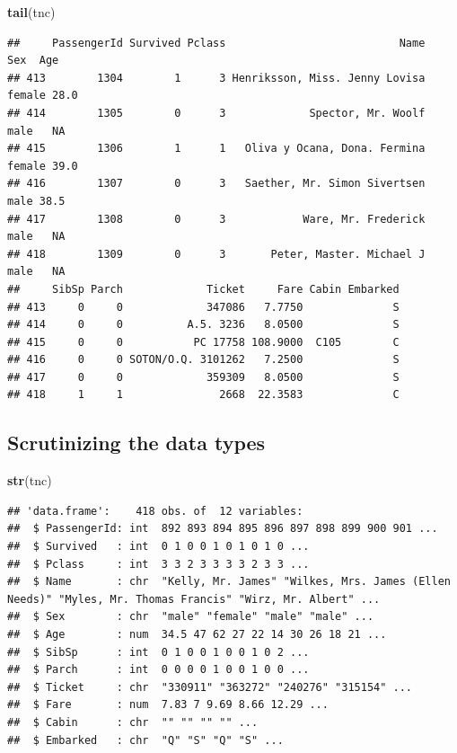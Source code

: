 \documentclass[
]{article}
\newenvironment{Shaded}{\begin{snugshade}}{\end{snugshade}}
\newcommand{\FunctionTok}[1]{\textcolor[rgb]{1.00,0.58,0.35}{\textbf{#1}}}
\newcommand{\NormalTok}[1]{\textcolor[rgb]{0.74,0.68,0.62}{#1}}
\begin{document}
\begin{Shaded}
\begin{Highlighting}[]
\FunctionTok{tail}\NormalTok{(tnc)}
\end{Highlighting}
\end{Shaded}

\begin{verbatim}
##     PassengerId Survived Pclass                           Name    Sex  Age
## 413        1304        1      3 Henriksson, Miss. Jenny Lovisa female 28.0
## 414        1305        0      3             Spector, Mr. Woolf   male   NA
## 415        1306        1      1   Oliva y Ocana, Dona. Fermina female 39.0
## 416        1307        0      3   Saether, Mr. Simon Sivertsen   male 38.5
## 417        1308        0      3            Ware, Mr. Frederick   male   NA
## 418        1309        0      3       Peter, Master. Michael J   male   NA
##     SibSp Parch             Ticket     Fare Cabin Embarked
## 413     0     0             347086   7.7750              S
## 414     0     0          A.5. 3236   8.0500              S
## 415     0     0           PC 17758 108.9000  C105        C
## 416     0     0 SOTON/O.Q. 3101262   7.2500              S
## 417     0     0             359309   8.0500              S
## 418     1     1               2668  22.3583              C
\end{verbatim}

\hypertarget{scrutinizing-the-data-types}{%
\subsection{Scrutinizing the data
types}\label{scrutinizing-the-data-types}}

\begin{Shaded}
\begin{Highlighting}[]
\FunctionTok{str}\NormalTok{(tnc)}
\end{Highlighting}
\end{Shaded}

\begin{verbatim}
## 'data.frame':    418 obs. of  12 variables:
##  $ PassengerId: int  892 893 894 895 896 897 898 899 900 901 ...
##  $ Survived   : int  0 1 0 0 1 0 1 0 1 0 ...
##  $ Pclass     : int  3 3 2 3 3 3 3 2 3 3 ...
##  $ Name       : chr  "Kelly, Mr. James" "Wilkes, Mrs. James (Ellen Needs)" "Myles, Mr. Thomas Francis" "Wirz, Mr. Albert" ...
##  $ Sex        : chr  "male" "female" "male" "male" ...
##  $ Age        : num  34.5 47 62 27 22 14 30 26 18 21 ...
##  $ SibSp      : int  0 1 0 0 1 0 0 1 0 2 ...
##  $ Parch      : int  0 0 0 0 1 0 0 1 0 0 ...
##  $ Ticket     : chr  "330911" "363272" "240276" "315154" ...
##  $ Fare       : num  7.83 7 9.69 8.66 12.29 ...
##  $ Cabin      : chr  "" "" "" "" ...
##  $ Embarked   : chr  "Q" "S" "Q" "S" ...
\end{verbatim}
\end{document}
